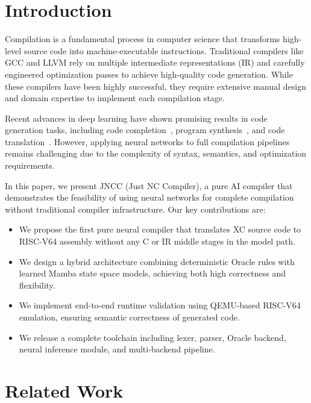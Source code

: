 \documentclass[12pt, a4paper, submitted, nofoot]{JNCCtemplate}
\title JNCC: Just NC Compiler \\
\affiliation{
    \department{Computer Science}
    \institution{}
}
\begin{document}
\maketitle

\section{Introduction}

Compilation is a fundamental process in computer science that transforms high-level source code into machine-executable instructions. Traditional compilers like GCC and LLVM rely on multiple intermediate representations (IR) and carefully engineered optimization passes to achieve high-quality code generation. While these compilers have been highly successful, they require extensive manual design and domain expertise to implement each compilation stage.

Recent advances in deep learning have shown promising results in code generation tasks, including code completion~\cite{floyd2019evaluate}, program synthesis~\cite{chen2021Evaluating}, and code translation~\cite{lachaux2020studying}. However, applying neural networks to full compilation pipelines remains challenging due to the complexity of syntax, semantics, and optimization requirements.

In this paper, we present JNCC (Just NC Compiler), a pure AI compiler that demonstrates the feasibility of using neural networks for complete compilation without traditional compiler infrastructure. Our key contributions are:

\begin{itemize}
    \item We propose the first pure neural compiler that translates XC source code to RISC-V64 assembly without any C or IR middle stages in the model path.
    \item We design a hybrid architecture combining deterministic Oracle rules with learned Mamba state space models, achieving both high correctness and flexibility.
    \item We implement end-to-end runtime validation using QEMU-based RISC-V64 emulation, ensuring semantic correctness of generated code.
    \item We release a complete toolchain including lexer, parser, Oracle backend, neural inference module, and multi-backend pipeline.
\end{itemize}

\section{Related Work}
\end{document}
